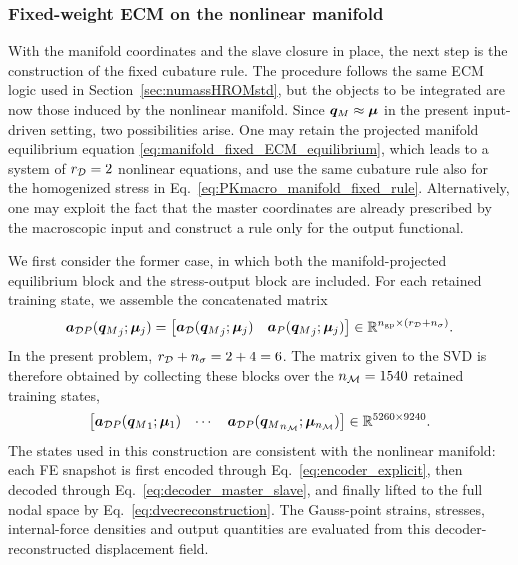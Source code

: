 \documentclass[11pt,a4paper]{article}
\newcommand{\PROMPT}[1]{ }
\begin{document}
\PROMPT{}

%
\subsubsection{Fixed-weight ECM on the nonlinear manifold}
\label{subsubsec:fixed_weight_ECM_manifold_cell}

With the manifold coordinates and the slave closure in place, the next step is
the construction of the fixed cubature rule. The procedure follows the same ECM
logic used in Section~\ref{sec:numassHROMstd}, but the objects to be integrated
are now those induced by the nonlinear manifold. Since
$\bm{q}_M\approx\bm{\mu}$ in the present input-driven setting, two possibilities arise.
One may retain the projected manifold equilibrium equation
\eqref{eq:manifold_fixed_ECM_equilibrium}, which leads to a system of
$r_{\mathcal{D}}=2$ nonlinear equations, and use the same cubature rule also for the
homogenized stress in Eq.~\eqref{eq:PKmacro_manifold_fixed_rule}. Alternatively,
one may exploit the fact that the master coordinates are already prescribed by
the macroscopic input and construct a rule only for the output functional.

We first consider the former case, in which both the manifold-projected
equilibrium block and the stress-output block are included. For each retained
training state, we assemble the concatenated matrix
\begin{equation}
\label{eq:aDP_single_state}
    \bm{a}_{\mathcal{D}P}({\bm{q}_M}_j;\bm{\mu}_j)
    =
    \begin{bmatrix}
    \bm{a}_{\mathcal{D}}({\bm{q}_M}_j;\bm{\mu}_j) &
    \bm{a}_{P}({\bm{q}_M}_j;\bm{\mu}_j)
    \end{bmatrix}
    \in
    \mathbb{R}^{n_{\mathrm{gp}}\times(r_{\mathcal{D}}+n_{\sigma})} .
\end{equation}
In the present problem, $r_{\mathcal{D}}+n_{\sigma}=2+4=6$. The matrix given to the SVD is
therefore obtained by collecting these blocks over the $n_{\mathcal{M}}=1540$ retained
training states,
\[
    \begin{bmatrix}
    \bm{a}_{\mathcal{D}P}({\bm{q}_M}_1;\bm{\mu}_1) &
    \cdots &
    \bm{a}_{\mathcal{D}P}({\bm{q}_M}_{n_{\mathcal{M}}};\bm{\mu}_{n_{\mathcal{M}}})
    \end{bmatrix}
    \in
    \mathbb{R}^{5260\times 9240}.
\]
The states used in this construction are consistent with the nonlinear
manifold: each FE snapshot is first encoded through
Eq.~\eqref{eq:encoder_explicit}, then decoded through
Eq.~\eqref{eq:decoder_master_slave}, and finally lifted to the full nodal
space by Eq.~\eqref{eq:dvecreconstruction}. The Gauss-point strains, stresses,
internal-force densities and output quantities are evaluated from this
decoder-reconstructed displacement field.
\end{document}
